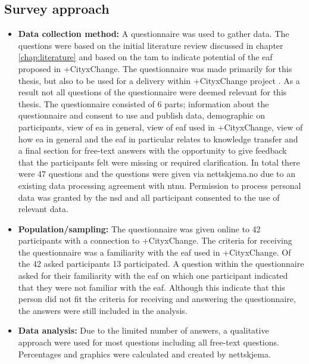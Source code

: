 \subsection{Survey approach}
\begin{itemize}
    \item \textbf{Data collection method:} A questionnaire was used to gather data. The questions were based on the initial literature review discussed in chapter \ref{chap:literature} and based on the \gls{tam} to indicate potential of the \gls{eaf} proposed in +CityxChange.
    The questionnaire was made primarily for this thesis, but also to be used for a delivery within +CityxChange project \cite{cityxchange-d1.2}. As a result not all questions of the questionnaire were deemed relevant for this thesis. The questionnaire consisted of 6 parts; information about the questionnaire and consent to use and publish data, demographic on participants, view of \gls{ea} in general, view of \gls{eaf} used in +CityxChange, view of how \gls{ea} in general and the \gls{eaf} in particular relates to knowledge transfer and a final section for free-text answers with the opportunity to give feedback that the participants felt were missing or required clarification.
    In total there were 47 questions and the questions were given via nettskjema.no due to an existing data processing agreement with \gls{ntnu}. Permission to process personal data was granted by the \gls{nsd} and all participant consented to the use of relevant data.
    \item \textbf{Population/sampling:}
    The questionnaire was given online to 42 participants with a connection to +CityxChange. The criteria for receiving the questionnaire was a familiarity with the \gls{eaf} used in +CityxChange. Of the 42 asked participants 13 participated. A question within the questionnaire asked for their familiarity with the \gls{eaf} on which one participant indicated that they were not familiar with the \gls{eaf}. Although this indicate that this person did not fit the criteria for receiving and answering the questionnaire, the answers were still included in the analysis. 
    \item \textbf{Data analysis:} Due to the limited number of answers, a qualitative approach were used for most questions including all free-text questions. Percentages and graphics were calculated and created by nettskjema. 
    \iffalse Analysis was conducted using \gls{spss}. \fi
\end{itemize}

